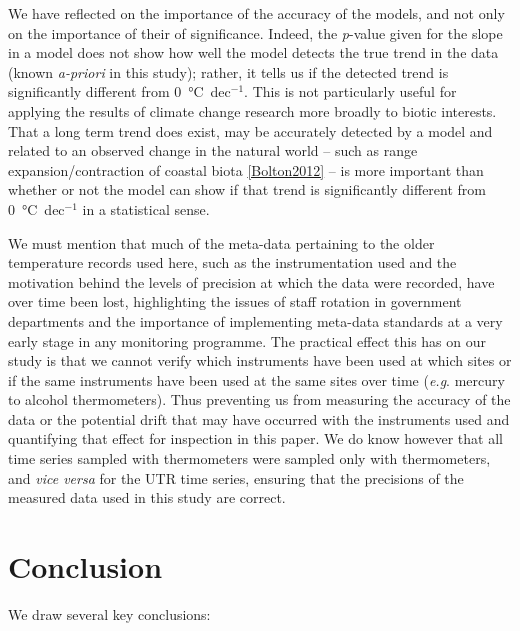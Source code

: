 \documentclass[]{ametsoc}
\begin{document}
We have reflected on the importance of the accuracy of the models, and not only on the importance of their of significance. Indeed, the \emph{p}-value given for the slope in a model does not show how well the model detects the true trend in the data (known \emph{a-priori} in this study); rather, it tells us if the detected trend is significantly different from \SI{0}{\degreeCelsius}~dec$^{-1}$. This is not particularly useful for applying the results of climate change research more broadly to biotic interests. That a long term trend does exist, may be accurately detected by a model and related to an observed change in the natural world -- such as range expansion/contraction of coastal biota \ref{Bolton2012} -- is more important than whether or not the model can show if that trend is significantly different from \SI{0}{\degreeCelsius}~dec$^{-1}$ in a statistical sense.

We must mention that much of the meta-data pertaining to the older temperature records used here, such as the instrumentation used and the motivation behind the levels of precision at which the data were recorded, have over time been lost, highlighting the issues of staff rotation in government departments and the importance of implementing meta-data standards at a very early stage in any monitoring programme. The practical effect this has on our study is that we cannot verify which instruments have been used at which sites or if the same instruments have been used at the same sites over time (\emph{e.g}. mercury to alcohol thermometers). Thus preventing us from measuring the accuracy of the data or the potential drift that may have occurred with the instruments used and quantifying that effect for inspection in this paper. We do know however that all time series sampled with thermometers were sampled only with thermometers, and \emph{vice versa} for the UTR time series, ensuring that the precisions of the measured data used in this study are correct.



\section{Conclusion}
We draw several key conclusions:
\end{document}
